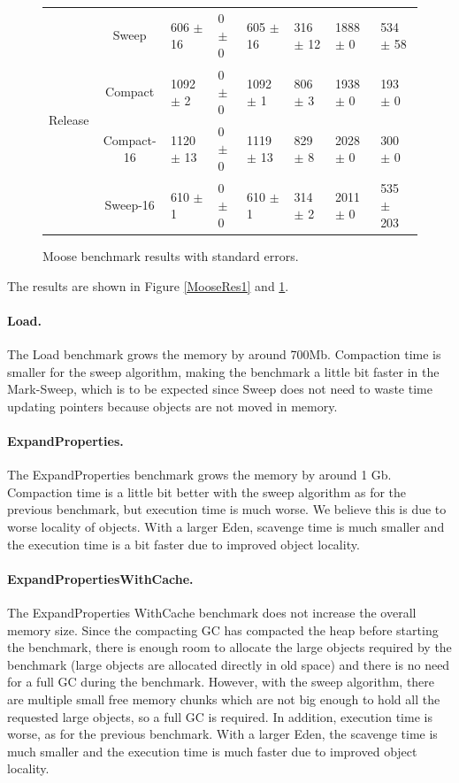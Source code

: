 \documentclass[10pt, sigplan]{acmart}
\begin{document}
\begin{figure}[thb]
\begin{tabular}{|c|c|l|l|l|l|l|l|}
   \hline
   \multirow{4}{*}{Release} 	& Sweep 		& 606 $\pm$ 16 		&	0 $\pm$ 0 	& 605 $\pm$ 16 	&316 $\pm$ 12 		& 1888 $\pm$ 0 		& 534 $\pm$ 58 \\
    				    		& Compact 	& 1092 $\pm$ 2 		&	0 $\pm$ 0 	& 1092 $\pm$ 1 	&806 $\pm$ 3 			& 1938 $\pm$ 0 		& 193 $\pm$ 0 \\
    				    & Compact-16 	& 1120 $\pm$ 13 		&	0 $\pm$ 0 		& 1119 $\pm$ 13 	&829 $\pm$ 8 			& 2028 $\pm$ 0 		& 300 $\pm$ 0 \\
    				    & Sweep-16 		& 610 $\pm$ 1 			&	0 $\pm$ 0 		& 610 $\pm$ 1 		&314 $\pm$ 2 			& 2011 $\pm$ 0 		& 535 $\pm$ 203 \\
   \hline
\end{tabular} 
\caption{Moose benchmark results with standard errors.} \label{MooseRes2}
\end{figure}

The results are shown in Figure \ref{MooseRes1} and \ref{MooseRes2}. 

\paragraph{Load.} The Load benchmark grows the memory by around 700Mb. Compaction time is smaller for the sweep algorithm, making the benchmark a little bit faster in the Mark-Sweep, which is to be expected since Sweep does not need to waste time updating pointers because objects are not moved in memory.

\paragraph{ExpandProperties.} The ExpandProperties benchmark grows the memory by around 1 Gb. Compaction time is a little bit better with the sweep algorithm as for the previous benchmark, but execution time is much worse. We believe this is due to worse locality of objects. With a larger Eden,  scavenge time is much smaller and the execution time is a bit faster due to improved object locality.

\paragraph{ExpandPropertiesWithCache.} The ExpandProperties WithCache benchmark does not increase the overall memory size. Since the compacting GC has compacted the heap before starting the benchmark, there is enough room to allocate the large objects required by the benchmark (large objects are allocated directly in old space) and there is no need for a full GC during the benchmark. However, with the sweep algorithm, there are multiple small free memory chunks which are not big enough to hold all the requested large objects, so a full GC is required. In addition, execution time is worse, as for the previous benchmark. With a larger Eden, the scavenge time is much smaller and the execution time is much faster due to improved object locality.
\end{document}
